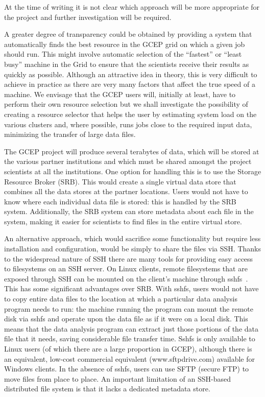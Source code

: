 \documentclass[times,10pt,twocolumn,8.5x11]{article}
\begin{document}
At the time of writing it is not clear which approach will be more appropriate for the project and further investigation will be required.

A greater degree of transparency could be obtained by providing a system that automatically finds the best resource in the GCEP grid on which a given job should run.  This might involve automatic selection of the ``fastest'' or ``least busy'' machine in the Grid to ensure that the scientists receive their results as quickly as possible.  Although an attractive idea in theory, this is very difficult to achieve in practice as there are very many factors that affect the true speed of a machine.  We envisage that the GCEP users will, initially at least, have to perform their own resource selection but we shall investigate the possibility of creating a resource selector that helps the user by estimating system load on the various clusters and, where possible, runs jobs close to the required input data, minimizing the transfer of large data files.

\label{sec:datamanagement}
The GCEP project will produce several terabytes of data, which will be stored at the various partner institutions and which must be shared amongst the project scientists at all the institutions.  One option for handling this is to use the Storage Resource Broker (SRB).  This would create a single virtual data store that combines all the data stores at the partner locations.  Users would not have to know where each individual data file is stored: this is handled by the SRB system.  Additionally, the SRB system can store metadata about each file in the system, making it easier for scientists to find files in the entire virtual store.

An alternative approach, which would sacrifice some functionality but require less installation and configuration, would be simply to share the files via SSH.  Thanks to the widespread nature of SSH there are many tools for providing easy access to filesystems on an SSH server.  On Linux clients, remote filesystems that are exposed through SSH can be mounted on the client's machine through sshfs~\cite{sshfs}.  This has some significant advantages over SRB.  With sshfs, users would not have to copy entire data files to the location at which a particular data analysis program needs to run: the machine running the program can mount the remote disk via sshfs and operate upon the data file as if it were on a local disk.  This means that the data analysis program can extract just those portions of the data file that it needs, saving considerable file transfer time.  Sshfs is only available to Linux users (of which there are a large proportion in GCEP), although there is an equivalent, low-cost commercial equivalent (www.sftpdrive.com) available for Windows clients.  In the absence of sshfs, users can use SFTP (secure FTP) to move files from place to place.  An important limitation of an SSH-based distributed file system is that it lacks a dedicated metadata store.
\end{document}
